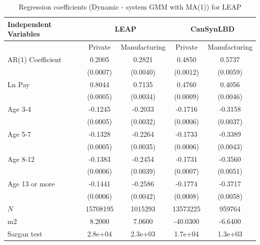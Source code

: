 \documentclass[10pt,twoside]{article}
\newcommand{\sym}[1]{\rlap{#1}}
\begin{document}
\begin{table}[H]
  \centering
\begin{threeparttable}
 \caption{Regression coefficients (Dynamic - system GMM with MA(1)) for LEAP} \label{tab:Dynamic - system GMM with MA(1)_can} \medskip
\renewcommand{\arraystretch}{1}
\begin{tabular}{l|c c| c c}
\toprule
\textbf{Independent Variables}&\multicolumn{2}{c|}{\textbf{LEAP}} &  \multicolumn{2}{c}{\textbf{CanSynLBD}}\\
\midrule
&\multicolumn{1}{c}{Private}&\multicolumn{1}{c}{Manufacturing}&\multicolumn{1}{c}{Private}&\multicolumn{1}{c}{Manufacturing}\\
\hline
AR(1) Coefficient&   0.2005\sym{***}&   0.2821\sym{***}&   0.4850\sym{***}&   0.5737\sym{***}\\
          & (0.0007)         & (0.0040)         & (0.0012)         & (0.0059)         \\
[1em]
Ln Pay    &   0.8044\sym{***}&   0.7135\sym{***}&   0.4760\sym{***}&   0.4056\sym{***}\\
          & (0.0005)         & (0.0034)         & (0.0009)         & (0.0046)         \\
[1em]
Age 3-4   &  -0.1245\sym{***}&  -0.2033\sym{***}&  -0.1716\sym{***}&  -0.3158\sym{***}\\
          & (0.0005)         & (0.0032)         & (0.0006)         & (0.0037)         \\
[1em]
Age 5-7   &  -0.1328\sym{***}&  -0.2264\sym{***}&  -0.1733\sym{***}&  -0.3389\sym{***}\\
          & (0.0005)         & (0.0035)         & (0.0006)         & (0.0043)         \\
[1em]
Age 8-12  &  -0.1383\sym{***}&  -0.2454\sym{***}&  -0.1731\sym{***}&  -0.3560\sym{***}\\
          & (0.0006)         & (0.0039)         & (0.0007)         & (0.0051)         \\
[1em]
Age 13 or more&  -0.1441\sym{***}&  -0.2586\sym{***}&  -0.1774\sym{***}&  -0.3717\sym{***}\\
          & (0.0006)         & (0.0042)         & (0.0008)         & (0.0058)         \\
\hline
\(N\)     & 15708195         &  1015293         & 13573225         &   959764         \\
m2        &   8.2000         &   7.0600         & -40.0300         &  -6.6400         \\
Sargan test&  2.8e+04         &  2.3e+03         &  1.7e+04         &  1.3e+03         \\

\end{tabular}
\end{threeparttable}
\end{table}
\end{document}
